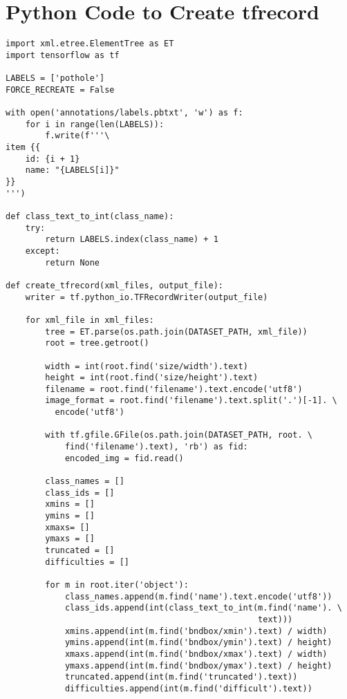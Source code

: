     \section{Python Code to Create tfrecord}\label{A.2}
        \begin{verbatim}
import xml.etree.ElementTree as ET
import tensorflow as tf

LABELS = ['pothole']
FORCE_RECREATE = False

with open('annotations/labels.pbtxt', 'w') as f:
    for i in range(len(LABELS)):
        f.write(f'''\
item {{
    id: {i + 1}
    name: "{LABELS[i]}"
}}
''')

def class_text_to_int(class_name):
    try:
        return LABELS.index(class_name) + 1
    except:
        return None

def create_tfrecord(xml_files, output_file):
    writer = tf.python_io.TFRecordWriter(output_file)

    for xml_file in xml_files:
        tree = ET.parse(os.path.join(DATASET_PATH, xml_file))
        root = tree.getroot()

        width = int(root.find('size/width').text)
        height = int(root.find('size/height').text)
        filename = root.find('filename').text.encode('utf8')
        image_format = root.find('filename').text.split('.')[-1]. \
          encode('utf8')

        with tf.gfile.GFile(os.path.join(DATASET_PATH, root. \
            find('filename').text), 'rb') as fid:
            encoded_img = fid.read()

        class_names = []
        class_ids = []
        xmins = []
        ymins = []
        xmaxs= []
        ymaxs = []
        truncated = []
        difficulties = []

        for m in root.iter('object'):
            class_names.append(m.find('name').text.encode('utf8'))
            class_ids.append(int(class_text_to_int(m.find('name'). \
                                                   text)))
            xmins.append(int(m.find('bndbox/xmin').text) / width)
            ymins.append(int(m.find('bndbox/ymin').text) / height)
            xmaxs.append(int(m.find('bndbox/xmax').text) / width)
            ymaxs.append(int(m.find('bndbox/ymax').text) / height)
            truncated.append(int(m.find('truncated').text))
            difficulties.append(int(m.find('difficult').text))


\end{verbatim}

